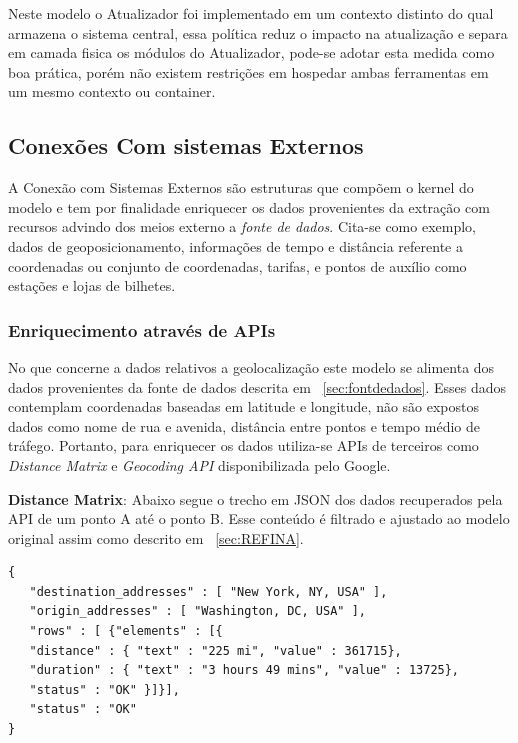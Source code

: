 \documentclass[12pt]{article}
\begin{document}
Neste modelo o Atualizador foi implementado em um contexto distinto do qual armazena o sistema central, essa política reduz o impacto na atualização e separa em camada fisica os módulos do Atualizador, pode-se adotar esta medida como boa prática, porém não existem restrições em hospedar ambas ferramentas em um mesmo contexto ou container.

\subsection{Conexões Com sistemas Externos}\label{sec:sistemasexternos}
A Conexão com Sistemas Externos são estruturas que compõem o kernel do modelo e tem por finalidade enriquecer os dados provenientes da extração com recursos advindo dos meios externo a \textit{fonte de dados}. Cita-se como exemplo, dados de geoposicionamento, informações de tempo e distância referente a coordenadas ou conjunto de coordenadas, tarifas, e pontos de auxílio como estações e lojas de bilhetes.

\subsubsection{Enriquecimento através de APIs}\label{sec:api}
No que concerne a dados relativos a geolocalização este modelo se alimenta dos dados provenientes da fonte de dados descrita em ~\ref{sec:fontdedados}. Esses dados contemplam coordenadas baseadas em latitude e longitude, não são expostos dados como nome de rua e avenida, distância entre pontos e tempo médio de tráfego. Portanto, para enriquecer os dados utiliza-se APIs de terceiros como \textit{Distance Matrix} e \textit{Geocoding API} disponibilizada pelo Google. 

\textbf{Distance Matrix}: Abaixo segue o trecho em JSON dos dados recuperados pela API de um ponto A até o ponto B. Esse conteúdo é filtrado e ajustado ao modelo original assim como descrito em ~\ref{sec:REFINA}.

\begin{lstlisting}
{
   "destination_addresses" : [ "New York, NY, USA" ],
   "origin_addresses" : [ "Washington, DC, USA" ],
   "rows" : [ {"elements" : [{
   "distance" : { "text" : "225 mi", "value" : 361715},
   "duration" : { "text" : "3 hours 49 mins", "value" : 13725},
   "status" : "OK" }]}],
   "status" : "OK"
}
\end{lstlisting}
\end{document}
